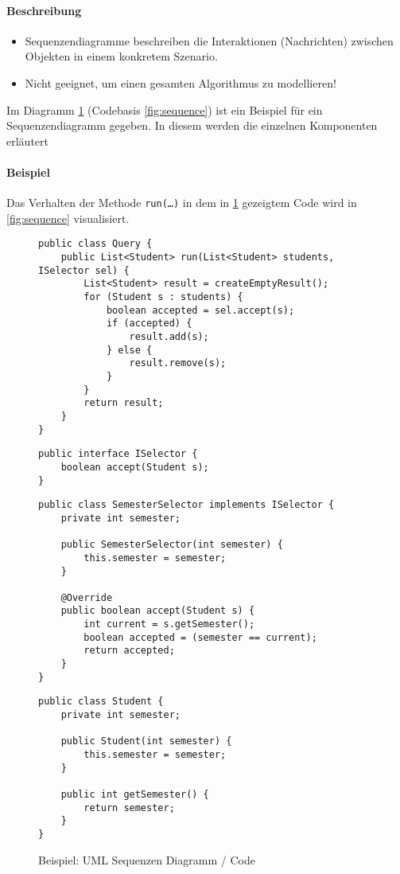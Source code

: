 			\paragraph{Beschreibung}
				\begin{itemize}
					\item Sequenzendiagramme beschreiben die Interaktionen (Nachrichten) zwischen Objekten in einem konkretem Szenario.
					\item Nicht geeignet, um einen gesamten Algorithmus zu modellieren!
				\end{itemize}

				Im Diagramm \ref{fig:sequencecode} (Codebasis \ref{fig:sequence}) ist ein Beispiel für ein Sequenzendiagramm gegeben. In diesem werden die einzelnen Komponenten erläutert

			\paragraph{Beispiel}
				Das Verhalten der Methode \texttt{run(\dots)} in dem in \ref{fig:sequencecode} gezeigtem Code  wird in \ref{fig:sequence} visualisiert.

				\begin{figure}[ht]
					\centering
					\begin{lstlisting}
public class Query {
	public List<Student> run(List<Student> students, ISelector sel) {
		List<Student> result = createEmptyResult();
		for (Student s : students) {
			boolean accepted = sel.accept(s);
			if (accepted) {
				result.add(s);
			} else {
				result.remove(s);
			}
		}
		return result;
	}
}
					\end{lstlisting}
					\begin{lstlisting}
public interface ISelector {
	boolean accept(Student s);
}
					\end{lstlisting}
					\begin{lstlisting}
public class SemesterSelector implements ISelector {
	private int semester;

	public SemesterSelector(int semester) {
		this.semester = semester;
	}

	@Override
	public boolean accept(Student s) {
		int current = s.getSemester();
		boolean accepted = (semester == current);
		return accepted;
	}
}
					\end{lstlisting}
					\begin{lstlisting}
public class Student {
	private int semester;

	public Student(int semester) {
		this.semester = semester;
	}

	public int getSemester() {
		return semester;
	}
}
					\end{lstlisting}
					\caption{Beispiel: UML Sequenzen Diagramm / Code}
					\label{fig:sequencecode}
				\end{figure}

